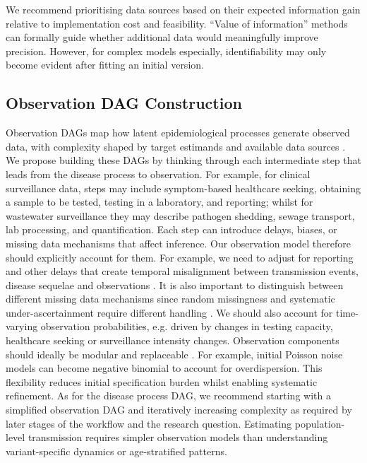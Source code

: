 \documentclass{article}
\begin{document}
We recommend prioritising data sources based on their expected information gain relative to implementation cost and feasibility. ``Value of information'' methods \citep{jackson2019value,heath2024value} can formally guide whether additional data would meaningfully improve precision. However, for complex models especially, identifiability may only become evident after fitting an initial version.

\subsection{Observation DAG Construction} \label{sec:observation}

Observation DAGs map how latent epidemiological processes generate observed data, with complexity shaped by target estimands and available data sources \citep{deangelis2018analysing}.
We propose building these DAGs by thinking through each intermediate step that leads from the disease process to observation.
For example, for clinical surveillance data, steps may include symptom-based healthcare seeking, obtaining a sample to be tested, testing in a laboratory, and reporting; whilst for wastewater surveillance they may describe pathogen shedding, sewage transport, lab processing, and quantification.
Each step can introduce delays, biases, or missing data mechanisms that affect inference. Our observation model therefore should explicitly account for them. For example, we need to adjust for reporting and other delays that create temporal misalignment between transmission events, disease sequelae and observations  \citep{seaman2022nowcasting}. It is also important to distinguish between different missing data mechanisms since random missingness and systematic under-ascertainment require different handling \citep{sherratt2021exploring}. We should also account for time-varying observation probabilities, e.g. driven by changes in testing capacity, healthcare seeking or surveillance intensity changes. Observation components should ideally be modular and replaceable  \citep{gelman2020bayesian}. For example, initial Poisson noise models can become negative binomial to account for overdispersion. This flexibility reduces initial specification burden whilst enabling systematic refinement.
As for the disease process DAG, we recommend starting with a simplified observation DAG and iteratively increasing complexity as required by later stages of the workflow and the research question.
Estimating population-level transmission requires simpler observation models than understanding variant-specific dynamics or age-stratified patterns.
\end{document}

